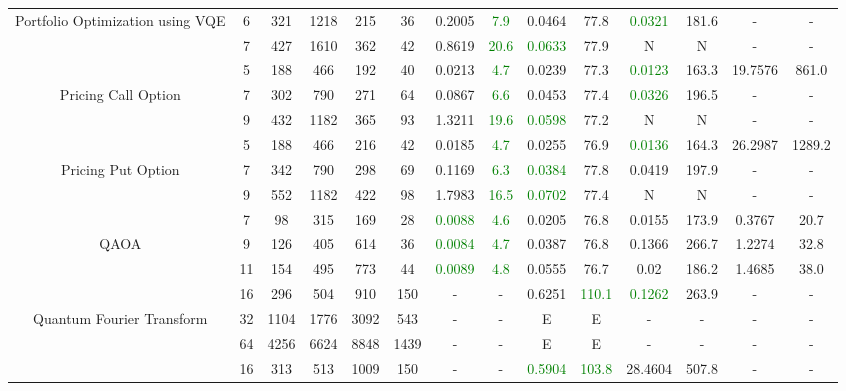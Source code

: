 \begin{table}[htb]
{\begin{tabular}{|c|c|c|c|c|c|c|c|c|c|c|c|c|c|}
Portfolio Optimization using VQE & 
6 & 321 & 1218 & 215 & 36
 & 0.2005 & \textcolor{green}{7.9}
 & 0.0464 & 77.8
 & \textcolor{green}{0.0321} & 181.6
 & - & -
 \\
 & 
7 & 427 & 1610 & 362 & 42
 & 0.8619 & \textcolor{green}{20.6}
 & \textcolor{green}{0.0633} & 77.9
 & N & N 
 & - & -
 \\
\hline
 & 
5 & 188 & 466 & 192 & 40
 & 0.0213 & \textcolor{green}{4.7}
 & 0.0239 & 77.3
 & \textcolor{green}{0.0123} & 163.3
 & 19.7576 & 861.0
 \\
Pricing Call Option & 
7 & 302 & 790 & 271 & 64
 & 0.0867 & \textcolor{green}{6.6}
 & 0.0453 & 77.4
 & \textcolor{green}{0.0326} & 196.5
 & - & -
 \\
 & 
9 & 432 & 1182 & 365 & 93
 & 1.3211 & \textcolor{green}{19.6}
 & \textcolor{green}{0.0598} & 77.2
 & N & N 
 & - & -
 \\
\hline
 & 
5 & 188 & 466 & 216 & 42
 & 0.0185 & \textcolor{green}{4.7}
 & 0.0255 & 76.9
 & \textcolor{green}{0.0136} & 164.3
 & 26.2987 & 1289.2
 \\
Pricing Put Option & 
7 & 342 & 790 & 298 & 69
 & 0.1169 & \textcolor{green}{6.3}
 & \textcolor{green}{0.0384} & 77.8
 & 0.0419 & 197.9
 & - & -
 \\
 & 
9 & 552 & 1182 & 422 & 98
 & 1.7983 & \textcolor{green}{16.5}
 & \textcolor{green}{0.0702} & 77.4
 & N & N 
 & - & -
 \\
\hline
 & 
7 & 98 & 315 & 169 & 28
 & \textcolor{green}{0.0088} & \textcolor{green}{4.6}
 & 0.0205 & 76.8
 & 0.0155 & 173.9
 & 0.3767 & 20.7
 \\
QAOA & 
9 & 126 & 405 & 614 & 36
 & \textcolor{green}{0.0084} & \textcolor{green}{4.7}
 & 0.0387 & 76.8
 & 0.1366 & 266.7
 & 1.2274 & 32.8
 \\
 & 
11 & 154 & 495 & 773 & 44
 & \textcolor{green}{0.0089} & \textcolor{green}{4.8}
 & 0.0555 & 76.7
 & 0.02 & 186.2
 & 1.4685 & 38.0
 \\
\hline
 & 
16 & 296 & 504 & 910 & 150
 & - & -
 & 0.6251 & \textcolor{green}{110.1}
 & \textcolor{green}{0.1262} & 263.9
 & - & -
 \\
Quantum Fourier Transform & 
32 & 1104 & 1776 & 3092 & 543
 & - & -
 & E & E
 & - & -
 & - & -
 \\
 & 
64 & 4256 & 6624 & 8848 & 1439
 & - & -
 & E & E
 & - & -
 & - & -
 \\
\hline
 & 
16 & 313 & 513 & 1009 & 150
 & - & -
 & \textcolor{green}{0.5904} & \textcolor{green}{103.8}
 & 28.4604 & 507.8
 & - & -
 \\

\end{tabular}}
\end{table}
